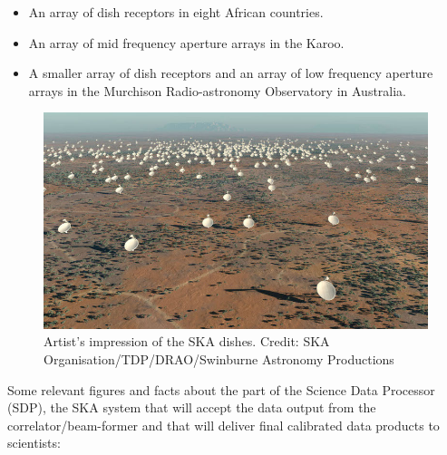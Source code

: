 \begin{itemize}
\item An array of dish receptors in eight African countries. 
\item An array of mid frequency aperture arrays in the Karoo. 
\item A smaller array of dish receptors and an array of low frequency aperture arrays in the Murchison Radio-astronomy Observatory in Australia.
\end{itemize}

 \begin{figure}[tb]
 \centering
 \includegraphics[width=\textwidth]{images/ska.jpg}
 \caption{Artist's impression of the SKA dishes. Credit: SKA Organisation/TDP/DRAO/Swinburne Astronomy Productions}
 \end{figure}


Some relevant figures and facts about the part of the Science Data Processor (SDP), the SKA system that will accept the data output from the correlator/beam-former and that will deliver final calibrated data products to scientists:

% 
% 

